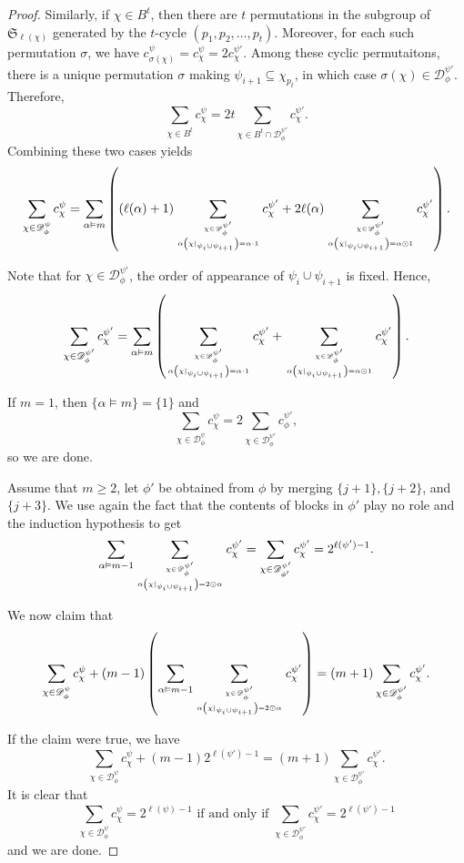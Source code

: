 \documentclass[11pt]{amsart}
\numberwithin{equation}{section}
\begin{document}
\begin{proof}
	Similarly, if $\chi\in B^t$, then there are $t$ permutations in the subgroup of $\mathfrak{S}_{\ell(\chi)}$ generated by the $t$-cycle $(p_1,p_2,\dots,p_t)$. Moreover, for each such permutation $\sigma$, we have $c_{\sigma(\chi)}^\psi=c_\chi^\psi=2c_\chi^{\psi'}$. Among these cyclic permutaitons,  there is a unique permutation $\sigma$ making $\psi_{i+1}\subseteq \chi_{p_t}$, in which case $\sigma(\chi)\in \mathscr{D}_\phi^{\psi'}$. Therefore, $$\displaystyle\sum_{\chi\in B^t}c_\chi^\psi=2t\sum_{\chi\in B^t\cap\mathscr{D}_\phi^{\psi'}}c_\chi^{\psi'}.$$ Combining these two cases yields
	$$\sum_{\chi\in\mathscr{D}_\phi^\psi}c_\chi^\psi=\sum_{\alpha\vDash m}\left((\ell(\alpha)+1)\sum_{\chi\in\mathscr{D}_\phi^{\psi'} \atop \alpha\left(\chi|_{\psi_i\cup \psi_{i+1}}\right)=\alpha\cdot 1}c_\chi^{\psi'}+2\ell(\alpha)\sum_{\chi\in\mathscr{D}_\phi^{\psi'} \atop \alpha\left(\chi|_{\psi_i\cup \psi_{i+1}}\right)=\alpha\odot 1}c_\chi^{\psi'}\right).$$
	
	Note that for $\chi\in\mathscr{D}_\phi^{\psi'}$, the order of appearance of $\psi_i\cup \psi_{i+1}$ is fixed. Hence,
	$$\sum_{\chi\in\mathscr{D}_\phi^{\psi'}}c_\chi^{\psi'}=\sum_{\alpha\vDash m}\left(\sum_{\chi\in\mathscr{D}_\phi^{\psi'} \atop \alpha\left(\chi|_{\psi_i\cup \psi_{i+1}}\right)=\alpha\cdot 1}c_\chi^{\psi'}+\sum_{\chi\in\mathscr{D}_\phi^{\psi'} \atop \alpha\left(\chi|_{\psi_i\cup \psi_{i+1}}\right)=\alpha\odot 1}c_\chi^{\psi'}\right).$$
	
	If $m=1$, then $\{\alpha\vDash m\}=\{1\}$ and $$\displaystyle\sum_{\chi\in\mathscr{D}_\phi^{\psi}}c_\chi^{\psi} = 2\sum_{\chi\in\mathscr{D}_\phi^{\psi'}}c_\phi^{\psi'},$$ so we are done.
	
	Assume that $m\geq2$, let $\phi'$ be obtained from $\phi$ by merging $\{j+1\},\{j+2\}$, and $\{j+3\}$. We use again the fact that the contents of blocks in $\phi'$ play no role and the induction hypothesis to get
	$$\sum_{\alpha\vDash m-1}\sum_{\chi\in\mathscr{D}_\phi^{\psi'} \atop \alpha\left(\chi|_{\psi_i\cup \psi_{i+1}}\right)=2\odot\alpha}c_\chi^{\psi'}=\sum_{\chi\in\mathscr{D}_{\phi'}^{\psi'}}c_\chi^{\psi'}=2^{\ell(\psi')-1}.$$
	
	We now claim that
	$$\sum_{\chi\in\mathscr{D}_\phi^\psi}c_\chi^\psi+(m-1)\left(\sum_{\alpha\vDash m-1}\sum_{\chi\in\mathscr{D}_\phi^{\psi'} \atop \alpha\left(\chi|_{\psi_i\cup \psi_{i+1}}\right)=2\odot\alpha}c_\chi^{\psi'}\right)=(m+1)\sum_{\chi\in\mathscr{D}_\phi^{\psi'}}c_\chi^{\psi'}.$$
	
	If the claim were true, we have
	$$\sum_{\chi\in\mathscr{D}_\phi^\psi}c_\chi^\psi+(m-1)2^{\ell(\psi')-1}=(m+1)\sum_{\chi\in\mathscr{D}_\phi^{\psi'}}c_\chi^{\psi'}.$$
	It is clear that  $$\displaystyle\sum_{\chi\in\mathscr{D}_\phi^\psi}c_\chi^\psi=2^{\ell(\psi)-1}\text{~if and only if~}\displaystyle\sum_{\chi\in\mathscr{D}_\phi^{\psi'}}c_\chi^{\psi'}=2^{\ell(\psi')-1}$$ and we are done.
	

\end{proof}
\end{document}
